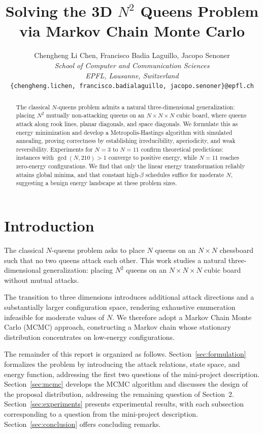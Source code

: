 \documentclass[10pt,twocolumn,a4paper]{article}
\title{\textbf{Solving the 3D $N^2$ Queens Problem\\ via Markov Chain Monte Carlo}}
\author{Chengheng Li Chen, Francisco Badia Laguillo, Jacopo Senoner\\
\textit{School of Computer and Communication Sciences}\\
\textit{EPFL, Lausanne, Switzerland}\\
\texttt{\{chengheng.lichen, francisco.badialaguillo, jacopo.senoner\}@epfl.ch}}
\date{}
\theoremstyle{definition}
\theoremstyle{remark}
\begin{document}
\maketitle

\begin{abstract}
The classical $N$-queens problem admits a natural three-dimensional generalization: placing $N^2$ mutually non-attacking queens on an $N\times N\times N$ cubic board, where queens attack along rook lines, planar diagonals, and space diagonals. We formulate this as energy minimization and develop a Metropolis-Hastings algorithm with simulated annealing, proving correctness by establishing irreducibility, aperiodicity, and weak reversibility. Experiments for $N=3$ to $N=11$ confirm theoretical predictions: instances with $\gcd(N,210)>1$ converge to positive energy, while $N=11$ reaches zero-energy configurations. We find that only the linear energy transformation reliably attains global minima, and that constant high-$\beta$ schedules suffice for moderate $N$, suggesting a benign energy landscape at these problem sizes.
\end{abstract}

\section{Introduction}
The classical $N$-queens problem asks to place $N$ queens on an $N\times N$ chessboard such that no two queens attack each other. This work studies a natural three-dimensional generalization: placing $N^2$ queens on an $N\times N\times N$ cubic board without mutual attacks.

The transition to three dimensions introduces additional attack directions and a substantially larger configuration space, rendering exhaustive enumeration infeasible for moderate values of $N$. We therefore adopt a Markov Chain Monte Carlo (MCMC) approach, constructing a Markov chain whose stationary distribution concentrates on low-energy configurations.

The remainder of this report is organized as follows. Section~\ref{sec:formulation} formalizes the problem by introducing the attack relations, state space, and energy function, addressing the first two questions of the mini-project description. Section~\ref{sec:mcmc} develops the MCMC algorithm and discusses the design of the proposal distribution, addressing the remaining question of Section~2. Section~\ref{sec:experiments} presents experimental results, with each subsection corresponding to a question from the mini-project description. Section~\ref{sec:conclusion} offers concluding remarks.
\end{document}
